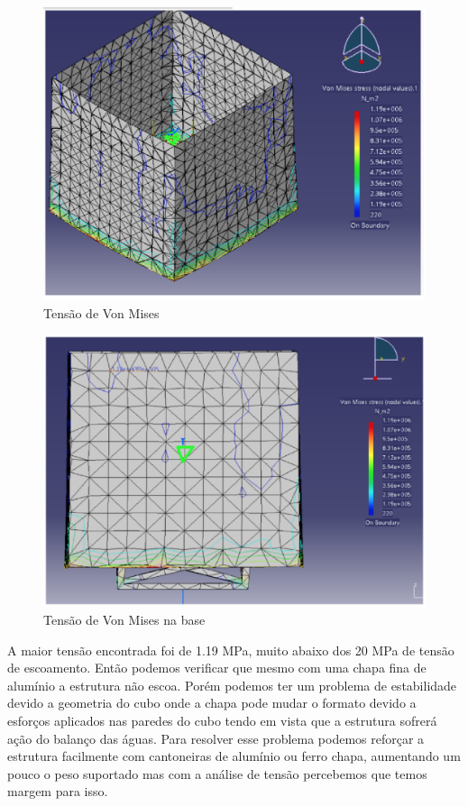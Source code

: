 \begin{figure}[H]
 \centering
   \includegraphics[keepaspectratio=true,scale=0.8]{figuras/estrutura9.eps}
 \caption{Tensão de Von Mises}
 \label{estrutura9}
\end{figure}
\begin{figure}[H]
 \centering
   \includegraphics[keepaspectratio=true,scale=0.8]{figuras/estrutura10.eps}
 \caption{Tensão de Von Mises na base}
 \label{estrutura10}
\end{figure}

A maior tensão encontrada foi de 1.19 MPa, muito abaixo dos 20 MPa de tensão de escoamento. Então podemos verificar que mesmo com uma chapa fina de alumínio a estrutura não escoa. Porém podemos ter um problema de estabilidade devido a geometria do cubo onde a chapa pode mudar o formato devido a esforços aplicados nas paredes do cubo tendo em vista que a estrutura sofrerá ação do balanço das águas. Para resolver esse problema podemos reforçar a estrutura facilmente com cantoneiras de alumínio ou ferro chapa, aumentando um pouco o peso suportado mas com a análise de tensão percebemos que temos margem para isso.

